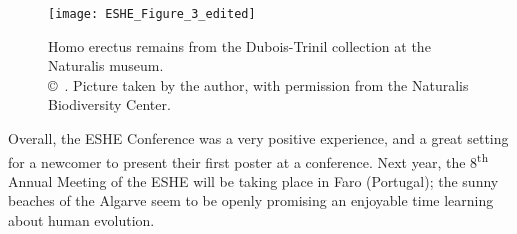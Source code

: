 \begin{figure}[!htb]
	\texttt{[image: ESHE\_Figure\_3\_edited]}
	\caption{Homo erectus remains from the Dubois-Trinil collection at the Naturalis museum.
		{\normalfont\scriptsize \\ \copyright\
			\shortauthor. Picture taken by the author, with permission from the Naturalis Biodiversity Center.
	}}
	\label{fig:ESHE_Figure_3_edited}
\end{figure}

Overall, the ESHE Conference was a very positive experience, and a great setting for a newcomer to present their first poster at a conference. Next year, the 8\textsuperscript{th} Annual Meeting of the ESHE will be taking place in Faro (Portugal); the sunny beaches of the Algarve seem to be openly promising an enjoyable time learning about human evolution.

\IJSRAclosing%
